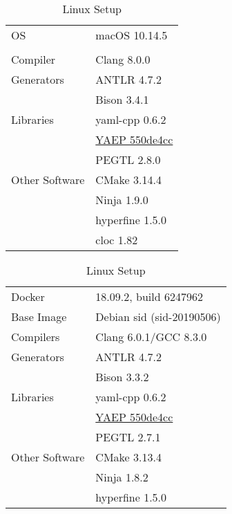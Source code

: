 \begin{table}[H]
    \newcommand{\YAEP}{{\href{https://github.com/vnmakarov/yaep/commit/550de4cc5600d5f6109c7ebcfbacec51bf80d8d3}{YAEP 550de4cc}}}
    \caption{Software Setup}
    \label{table:benchmark_software}
    \begin{subtable}[t]{.45\linewidth}
      \centering
        \caption{Mac Setup}
        \label{table:benchmark_mac}
        \begin{tabular}{ll}
\toprule
                OS &        macOS 10.14.5\\
                   &                     \\
\midrule
          Compiler &          Clang 8.0.0\\
        Generators &          ANTLR 4.7.2\\
                   &          Bison 3.4.1\\
         Libraries &       yaml-cpp 0.6.2\\
                   &                \YAEP\\
                   &          PEGTL 2.8.0\\
    Other Software &         CMake 3.14.4\\
                   &          Ninja 1.9.0\\
                   &      hyperfine 1.5.0\\
                   &            cloc 1.82\\
\bottomrule
        \end{tabular}
    \end{subtable}
    \begin{subtable}[t]{.45\linewidth}
      \centering
        \caption{Linux Setup}
        \label{table:benchmark_docker}
        \begin{tabular}{ll}
\toprule
            Docker &    18.09.2, build 6247962\\
        Base Image & Debian sid (sid-20190506)\\
\midrule
         Compilers &     Clang 6.0.1/GCC 8.3.0\\
        Generators &               ANTLR 4.7.2\\
                   &               Bison 3.3.2\\
         Libraries &            yaml-cpp 0.6.2\\
                   &                     \YAEP\\
                   &               PEGTL 2.7.1\\
    Other Software &              CMake 3.13.4\\
                   &               Ninja 1.8.2\\
                   &           hyperfine 1.5.0\\
\bottomrule
        \end{tabular}
    \end{subtable}
\end{table}

